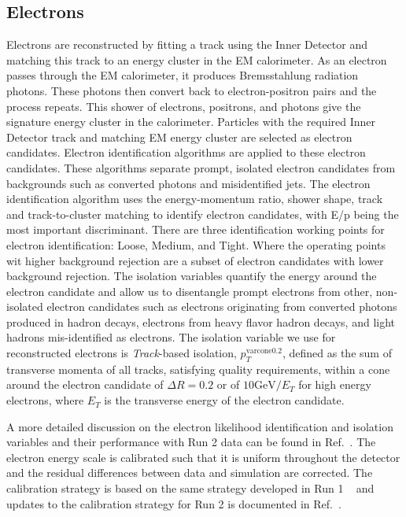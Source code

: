 \subsection{Electrons}
Electrons are reconstructed by fitting a track using the Inner Detector and matching this track to an energy cluster in the EM calorimeter\cite{Tarna:2286383}. As an electron passes through the EM calorimeter, it produces Bremsstahlung radiation photons. These photons then convert back to electron-positron pairs and the process repeats. This shower of electrons, positrons, and photons give the signature energy cluster in the calorimeter. Particles with the required Inner Detector track and matching EM energy cluster are selected as electron candidates.\newline
\indent Electron identification algorithms are applied to these electron candidates. These algorithms separate prompt, isolated electron candidates from backgrounds such as converted photons and misidentified jets. The electron identification algorithm uses the energy-momentum ratio, shower shape, track and track-to-cluster matching to identify electron candidates, with E/p being the most important discriminant. There are three identification working points for electron identification: Loose, Medium, and Tight. Where the operating points wit higher background rejection are a subset of electron candidates with lower background rejection.\newline
The isolation variables quantify the energy around the electron candidate and allow us to disentangle prompt electrons 
from other, non-isolated electron candidates such as electrons originating 
from converted photons produced in hadron decays, electrons from heavy flavor hadron decays, 
and light hadrons mis-identified as electrons. The isolation variable we use for reconstructed electrons 
is \textit{Track}-based isolation, ${p_{T}^{\mathrm{varcone0.2}}}$, defined as the sum of transverse momenta
of all tracks, satisfying quality requirements, within a cone around the electron candidate of ${\Delta R = 0.2}$ or of ${10\mathrm{GeV}/E_{T}}$ for high energy electrons, where $E_{T}$ is the transverse energy of the electron candidate.

A more detailed discussion on the electron likelihood identification and isolation variables 
and their performance with Run 2 data can be found in Ref.~\cite{ATLAS-CONF-2016-024}. 
The electron energy scale is calibrated such that it is uniform throughout the detector and the residual differences
between data and simulation are corrected. The calibration strategy is based on the same strategy developed 
in Run 1 ~\cite{ATLAS-EGAMMACALIB-RUN1} and updates to the calibration strategy for Run 2 is 
documented in Ref.~\cite{ATL-PHYS-PUB-2016-015}.
